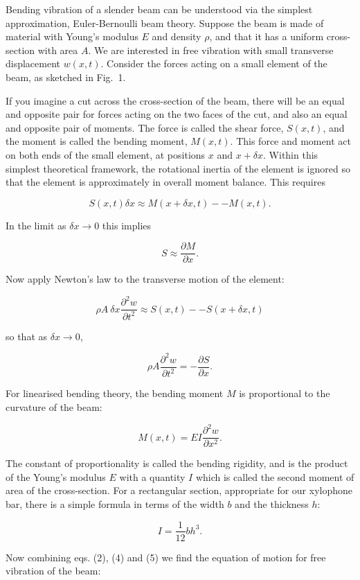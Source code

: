   Bending vibration of a slender beam can be understood via the simplest 
  approximation, Euler-Bernoulli beam theory. Suppose the beam is made of 
  material with Young's modulus $E$ and density $\rho$, and that it has a 
  uniform cross-section with area $A$. We are interested in free vibration with 
  small transverse displacement $w(x,t)$. Consider the forces acting on a small 
  element of the beam, as sketched in Fig.\ 1. 

  If you imagine a cut across the cross-section of the beam, there will be an 
  equal and opposite pair for forces acting on the two faces of the cut, and 
  also an equal and opposite pair of moments. The force is called the shear 
  force, $S(x,t)$, and the moment is called the bending moment, $M(x,t)$. This 
  force and moment act on both ends of the small element, at positions $x$ and 
  $x + \delta x$. Within this simplest theoretical framework, the rotational 
  inertia of the element is ignored so that the element is approximately in 
  overall moment balance. This requires 

  $$S(x,t) \delta x \approx M(x+ \delta x,t) -- M(x,t). \tag{1}$$ 

  In the limit as $\delta x \rightarrow 0$ this implies 

  $$S \approx \dfrac{\partial M}{\partial x} . \tag{2}$$ 

  Now apply Newton's law to the transverse motion of the element: 

  $$\rho A ~\delta x \dfrac{\partial^2 w}{\partial t^2} \approx S(x,t) -- 
  S(x+\delta x,t) \tag{3}$$ 

  so that as $\delta x \rightarrow 0$, 

  $$\rho A \dfrac{\partial^2 w}{\partial t^2} = -\dfrac{\partial S}{\partial 
  x}. \tag{4}$$ 

  For linearised bending theory, the bending moment $M$ is proportional to the 
  curvature of the beam: 

  $$M(x,t) = EI\dfrac{\partial^2 w}{\partial x^2} . \tag{5}$$ 

  The constant of proportionality is called the bending rigidity, and is the 
  product of the Young's modulus $E$ with a quantity $I$ which is called the 
  second moment of area of the cross-section. For a rectangular section, 
  appropriate for our xylophone bar, there is a simple formula in terms of the 
  width $b$ and the thickness $h$: 

  $$I=\dfrac{1}{12} bh^3. \tag{6}$$ 

  Now combining eqs. (2), (4) and (5) we find the equation of motion for free 
  vibration of the beam: 

